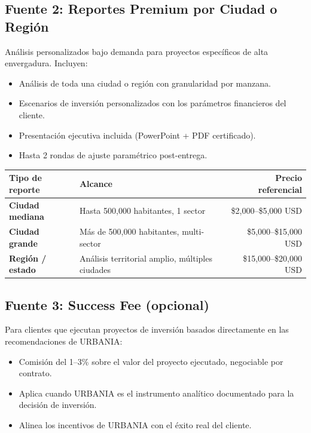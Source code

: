 \documentclass[12pt,a4paper]{article}
\begin{document}
\subsection{Fuente 2: Reportes Premium por Ciudad o Región}

Análisis personalizados bajo demanda para proyectos específicos de alta envergadura. Incluyen:

\begin{itemize}[leftmargin=1.5cm, itemsep=3pt]
  \item Análisis de toda una ciudad o región con granularidad por manzana.
  \item Escenarios de inversión personalizados con los parámetros financieros del cliente.
  \item Presentación ejecutiva incluida (PowerPoint + PDF certificado).
  \item Hasta 2 rondas de ajuste paramétrico post-entrega.
\end{itemize}

\begin{table}[H]
\centering
\small
\renewcommand{\arraystretch}{1.3}
\begin{tabularx}{\textwidth}{>{\bfseries}l X r}
\toprule
\rowcolor{grisoscuro}
\color{white}\textbf{Tipo de reporte} & \color{white}\textbf{Alcance} & \color{white}\textbf{Precio referencial} \\
\midrule
Ciudad mediana & Hasta 500{,}000 habitantes, 1 sector & \$2{,}000–\$5{,}000 USD \\
\rowcolor{fondofila}
Ciudad grande & Más de 500{,}000 habitantes, multi-sector & \$5{,}000–\$15{,}000 USD \\
Región / estado & Análisis territorial amplio, múltiples ciudades & \$15{,}000–\$20{,}000 USD \\
\bottomrule
\end{tabularx}
\end{table}

\subsection{Fuente 3: Success Fee (opcional)}

Para clientes que ejecutan proyectos de inversión basados directamente en las recomendaciones de URBANIA:

\begin{itemize}[leftmargin=1.5cm, itemsep=3pt]
  \item Comisión del 1–3\% sobre el valor del proyecto ejecutado, negociable por contrato.
  \item Aplica cuando URBANIA es el instrumento analítico documentado para la decisión de inversión.
  \item Alinea los incentivos de URBANIA con el éxito real del cliente.
\end{itemize}
\end{document}
